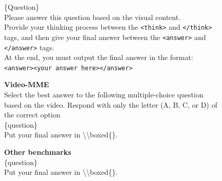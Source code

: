 \begin{figure}[h]
\begin{tcolorbox}[colback=black!7.5!white, colframe=black!80!white, title=All Benchmarks -- For \ours and OneThinker, fontupper=\footnotesize, fontlower=\footnotesize, fonttitle=\footnotesize]

\{Question\}\\
Please answer this question based on the visual content.\\
Provide your thinking process between the \texttt{<think>} and \texttt{</think>} tags, and then give your final answer between the \texttt{<answer>} and \texttt{</answer>} tags.\\
At the end, you must output the final answer in the format:\\
\texttt{<answer>}\texttt{<your answer here>}\texttt{</answer>}
\end{tcolorbox}

\end{figure}

\begin{figure}[h]
\begin{tcolorbox}[colback=black!7.5!white, colframe=black!80!white, title=All Benchmarks -- For VideoAuto-R1, fontupper=\footnotesize, fontlower=\footnotesize, fonttitle=\footnotesize]

\textbf{Video-MME}\\
Select the best answer to the following multiple-choice question based on the video. Respond with only the letter (A, B, C, or D)
of the correct option\\
\{question\}\\
Put your final answer in \textbackslash\textbackslash boxed\{\}.

\tcblower
\textbf{Other benchmarks}\\
\{question\}\\
Put your final answer in \textbackslash\textbackslash boxed\{\}.

\end{tcolorbox}
\end{figure}

